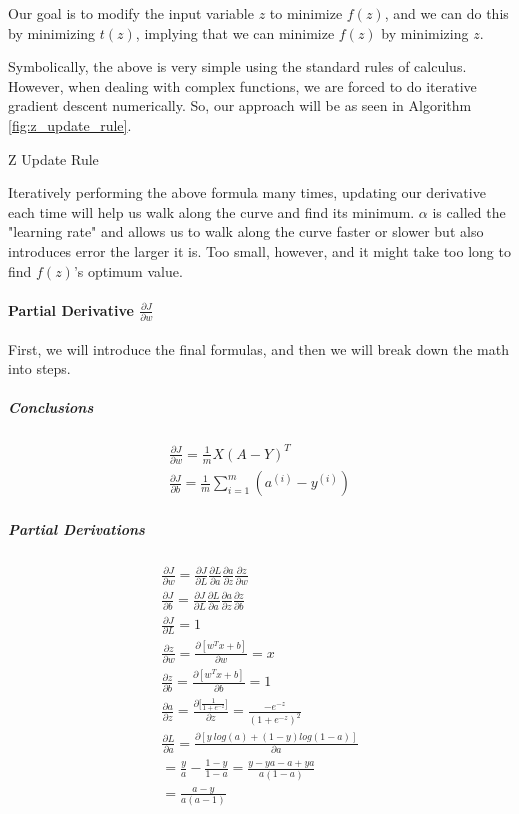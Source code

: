\documentclass{article}
\newcommand{\myparagraph}[1]{\paragraph{#1}\mbox{}}
\newcommand{\mysubparagraph}[1]{\subparagraph{#1}\mbox{}}
\begin{document}
Our goal is to modify the input variable $z$ to minimize $f(z)$, and we can do this by minimizing $t(z)$, implying that we can minimize $f(z)$ by minimizing $z$.

Symbolically, the above is very simple using the standard rules of calculus.  However, when dealing with complex functions, we are forced to do iterative gradient descent numerically.  So, our approach will be as seen in Algorithm \ref{fig:z_update_rule}.

\begin{algorithm}[h]
\caption{Z Update Rule}
\label{fig:z_update_rule}
\end{algorithm}

Iteratively performing the above formula many times, updating our derivative each time will help us walk along the curve and find its minimum.  $\alpha$ is called the "learning rate" and allows us to walk along the curve faster or slower but also introduces error the larger it is.  Too small, however, and it might take too long to find $f(z)$'s optimum value.

\myparagraph{Partial Derivative $\frac{\partial{J}}{\partial{w}}$}

First, we will introduce the final formulas, and then we will break down the math into steps.

\mysubparagraph{Conclusions}

\begin{gather}
\frac{\partial{J}}{\partial{w}} = \frac{1}{m}X(A-Y)^{T} \\
%
\frac{\partial{J}}{\partial{b}} = \frac{1}{m} \sum_{i=1}^{m}(a^{(i)} - y^{(i)})
\end{gather}

\mysubparagraph{Partial Derivations}

\begin{gather}
\frac{\partial{J}}{\partial{w}} = \frac{\partial{J}}{\partial{L}}\frac{\partial{L}}{\partial{a}}\frac{\partial{a}}{\partial{z}}\frac{\partial{z}}{\partial{w}} \label{eqn:dJ_dw} \\
%
\frac{\partial{J}}{\partial{b}} = \frac{\partial{J}}{\partial{L}}\frac{\partial{L}}{\partial{a}}\frac{\partial{a}}{\partial{z}}\frac{\partial{z}}{\partial{b}} \label{eqn:dJ_db} \\
%
\frac{\partial{J}}{\partial{L}} = 1 \\
%
\frac{\partial{z}}{\partial{w}} = \frac{\partial{[w^T x + b]}}{\partial{w}} = x \\
%
\frac{\partial{z}}{\partial{b}} = \frac{\partial{[w^{T} x + b]}}{\partial{b}} = 1 \\
%
\frac{\partial{a}}{\partial{z}} = \frac{\partial{[\frac{1}{1 + e^{-z}}}]}{\partial{z}} = \frac{-e^{-z}}{(1+e^{-z})^{2}} \\
%
\frac{\partial{L}}{\partial{a}} = \frac{\partial{[y\ log(a) + (1-y) log (1-a)]}}{\partial{a}} \\
= \frac{y}{a} - \frac{1-y}{1-a} = \frac{y-ya-a+ya}{a(1-a)} \\
= \frac{a-y}{a(a-1)}
\end{gather}
\end{document}
